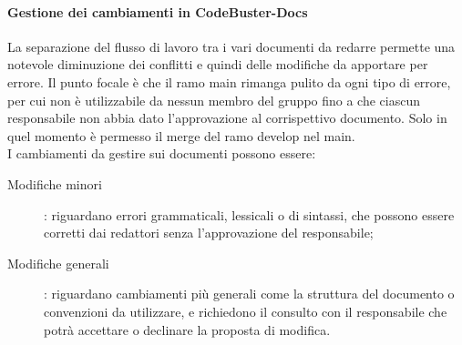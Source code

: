 \paragraph{Gestione dei cambiamenti in CodeBuster-Docs}
La separazione del flusso di lavoro tra i vari documenti da redarre permette una notevole diminuzione dei conflitti e quindi delle modifiche da apportare per errore. Il punto focale è che il ramo main rimanga pulito da ogni tipo di errore, per cui non è utilizzabile da nessun membro del gruppo fino a che ciascun responsabile non abbia dato l'approvazione al corrispettivo documento. Solo in quel momento è permesso il merge del ramo develop nel main. \\
I cambiamenti da gestire sui documenti possono essere:
\begin{description}
	\item[Modifiche minori] : riguardano errori grammaticali, lessicali o di sintassi, che possono essere corretti dai redattori senza l'approvazione del responsabile;
	\item[Modifiche generali] : riguardano cambiamenti più generali come la struttura del documento o convenzioni da utilizzare, e richiedono il consulto con il responsabile che potrà accettare o declinare la proposta di modifica.
\end{description} 











